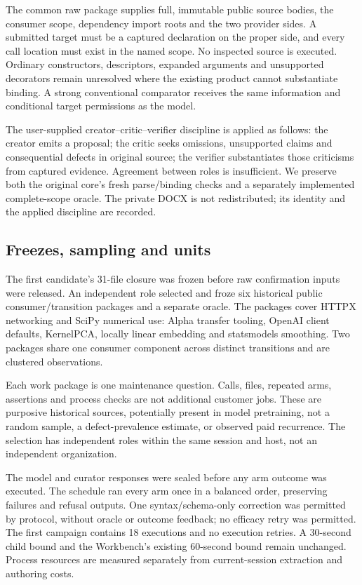 \documentclass[11pt,a4paper]{article}
\begin{document}
The common raw package supplies full, immutable public source bodies, the consumer scope, dependency import roots and the two provider sides. A submitted target must be a captured declaration on the proper side, and every call location must exist in the named scope. No inspected source is executed. Ordinary constructors, descriptors, expanded arguments and unsupported decorators remain unresolved where the existing product cannot substantiate binding. A strong conventional comparator receives the same information and conditional target permissions as the model.

The user-supplied creator--critic--verifier discipline is applied as follows: the creator emits a proposal; the critic seeks omissions, unsupported claims and consequential defects in original source; the verifier substantiates those criticisms from captured evidence. Agreement between roles is insufficient. We preserve both the original core's fresh parse/binding checks and a separately implemented complete-scope oracle. The private DOCX is not redistributed; its identity and the applied discipline are recorded.

\subsection{Freezes, sampling and units}
The first candidate's 31-file closure was frozen before raw confirmation inputs were released. An independent role selected and froze six historical public consumer/transition packages and a separate oracle. The packages cover HTTPX networking and SciPy numerical use: Alpha transfer tooling, OpenAI client defaults, KernelPCA, locally linear embedding and statsmodels smoothing. Two packages share one consumer component across distinct transitions and are clustered observations.

Each work package is one maintenance question. Calls, files, repeated arms, assertions and process checks are not additional customer jobs. These are purposive historical sources, potentially present in model pretraining, not a random sample, a defect-prevalence estimate, or observed paid recurrence. The selection has independent roles within the same session and host, not an independent organization.

The model and curator responses were sealed before any arm outcome was executed. The schedule ran every arm once in a balanced order, preserving failures and refusal outputs. One syntax/schema-only correction was permitted by protocol, without oracle or outcome feedback; no efficacy retry was permitted. The first campaign contains 18 executions and no execution retries. A 30-second child bound and the Workbench's existing 60-second bound remain unchanged. Process resources are measured separately from current-session extraction and authoring costs.
\end{document}

